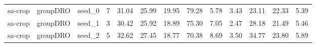 \documentclass[11pt]{article}
\begin{document}
\begin{table}[h!]
{\begin{tabular}{lllcccccccccc}
sa-crop & groupDRO & seed\_0 & 7 & 31.04 & 25.99 & 19.95 & 79.28 & 5.78 & 3.43 & 23.11 & 22.33 & 5.39 \\
sa-crop & groupDRO & seed\_1 & 3 & 30.42 & 25.92 & 18.89 & 75.30 & 7.05 & 2.47 & 28.18 & 21.49 & 5.46 \\
sa-crop & groupDRO & seed\_2 & 5 & 32.62 & 27.45 & 18.77 & 70.38 & 8.69 & 3.50 & 34.77 & 23.80 & 5.89 \\

\bottomrule
\end{tabular}%
}
\end{table}



\end{document}
